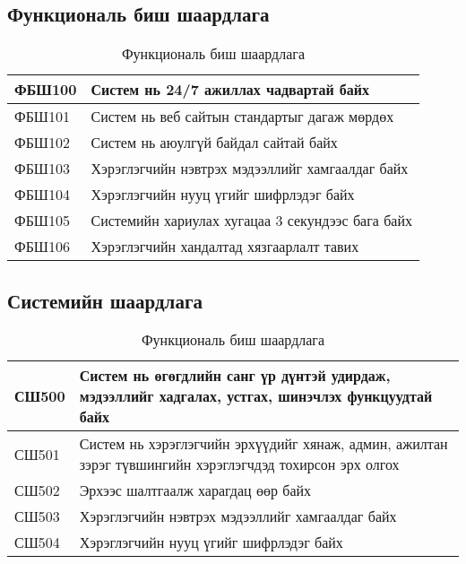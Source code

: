 \subsection{Функциональ биш шаардлага}

\begin{table}[H]
    \centering
    \label{my-label}
    \begin{tabular}{|p{1.7cm}|p{12cm}|}
        \hline
        ФБШ100 & Систем нь 24/7 ажиллах чадвартай байх\\ \hline
        ФБШ101 & Систем нь веб сайтын стандартыг дагаж мөрдөх\\ \hline
        ФБШ102 & Систем нь аюулгүй байдал сайтай байх\\ \hline
        ФБШ103 & Хэрэглэгчийн нэвтрэх мэдээллийг хамгаалдаг байх\\ \hline
        ФБШ104 & Хэрэглэгчийн нууц үгийг шифрлэдэг байх\\ \hline
        ФБШ105 & Системийн хариулах хугацаа 3 секундээс бага байх\\ \hline
        ФБШ106 & Хэрэглэгчийн хандалтад хязгаарлалт тавих\\ \hline
    \end{tabular}
    \caption{Функциональ биш шаардлага}
\end{table}

\subsection{Системийн шаардлага}

\begin{table}[H]
    \centering
    \label{my-label}
    \begin{tabular}{|p{1.7cm}|p{12cm}|}
        \hline
        СШ500 & Систем нь өгөгдлийн санг үр дүнтэй удирдаж, мэдээллийг хадгалах,
        устгах, шинэчлэх функцуудтай байх\\ \hline
        СШ501 & Систем нь хэрэглэгчийн эрхүүдийг хянаж, админ, ажилтан зэрэг
        түвшингийн хэрэглэгчдэд тохирсон эрх олгох\\ \hline
        СШ502 & Эрхээс шалтгаалж харагдац өөр байх\\ \hline
        СШ503 & Хэрэглэгчийн нэвтрэх мэдээллийг хамгаалдаг байх\\ \hline
        СШ504 & Хэрэглэгчийн нууц үгийг шифрлэдэг байх\\ \hline
    \end{tabular}
    \caption{Функциональ биш шаардлага}
\end{table}

